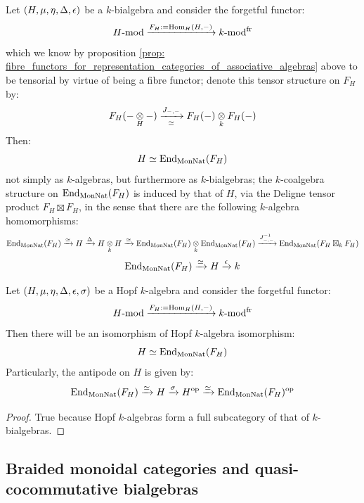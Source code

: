         \begin{theorem} \label{theorem: fibre_functors_for_representation_categories_of_bialgebras}
            Let $(H, \mu, \eta, \Delta, \epsilon)$ be a $k$-bialgebra and consider the forgetful functor:
                $$H\text{-}\mathrm{mod} \xrightarrow[]{F_H := \operatorname{Hom}_H(H, -)} k\text{-}\mathrm{mod}^{\mathrm{fr}}$$
            which we know by proposition \ref{prop: fibre_functors_for_representation_categories_of_associative_algebras} above to be tensorial by virtue of being a fibre functor; denote this tensor structure on $F_H$ by:
                $$F_H(- \tensor_H -) \xrightarrow[\cong]{J_{-, -}} F_H(-) \tensor_k F_H(-)$$
            Then:
                $$H \simeq \operatorname{End}_{\mathrm{Mon}\mathrm{Nat}}(F_H)$$
            not simply as $k$-algebras, but furthermore as $k$-bialgebras; the $k$-coalgebra structure on $\operatorname{End}_{\mathrm{Mon}\mathrm{Nat}}(F_H)$ is induced by that of $H$, via the Deligne tensor product $F_H \boxtimes F_H$, in the sense that there are the following $k$-algebra homomorphisms:
                $$\End_{\Mon\Nat}(F_H) \xrightarrow[]{\cong} H \xrightarrow[]{\Delta} H \tensor_k H \xrightarrow[]{\cong} \End_{\Mon\Nat}(F_H) \tensor_k \End_{\Mon\Nat}(F_H) \xrightarrow[]{J_{-, -}^{-1}} \End_{\Mon\Nat}(F_H \boxtimes_k F_H)$$
                $$\operatorname{End}_{\mathrm{Mon}\mathrm{Nat}}(F_H) \xrightarrow[]{\simeq} H \xrightarrow[]{\epsilon} k$$
        \end{theorem}
        \begin{corollary} \label{coro: fibre_functors_for_representation_categories_of_hopf_algebras}
            Let $(H, \mu, \eta, \Delta, \epsilon, \sigma)$ be a Hopf $k$-algebra and consider the forgetful functor:
                $$H\text{-}\mathrm{mod} \xrightarrow[]{F_H := \operatorname{Hom}_H(H, -)} k\text{-}\mathrm{mod}^{\mathrm{fr}}$$
            Then there will be an isomorphism of Hopf $k$-algebra isomorphism:
                $$H \simeq \operatorname{End}_{\mathrm{Mon}\mathrm{Nat}}(F_H)$$
            Particularly, the antipode on $H$ is given by:
                $$\operatorname{End}_{\mathrm{Mon}\mathrm{Nat}}(F_H) \xrightarrow[]{\simeq} H \xrightarrow[]{\sigma} H^{\mathrm{op}} \xrightarrow[]{\simeq} \operatorname{End}_{\mathrm{Mon}\mathrm{Nat}}(F_H)^{\mathrm{op}}$$
        \end{corollary}
            \begin{proof}
                True because Hopf $k$-algebras form a full subcategory of that of $k$-bialgebras. 
            \end{proof}
    
    \subsection{Braided monoidal categories and quasi-cocommutative bialgebras}

